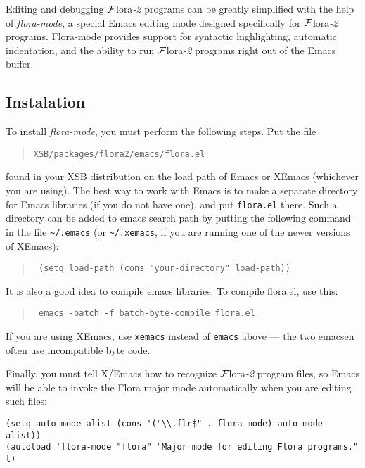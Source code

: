 \documentclass[11pt]{article}
\newcommand{\FLORA}{{\mbox{${\cal F}${\sc lora}\rm\emph{-2}}}\xspace}
\begin{document}
Editing and debugging \FLORA programs can be greatly simplified with the
help of \emph{flora-mode}, a special Emacs editing mode designed
specifically for \FLORA programs. Flora-mode provides support for syntactic
highlighting, automatic indentation, and the ability to run \FLORA programs
right out of the Emacs buffer.


\subsection{Instalation}


To install \emph{flora-mode}, you must perform the following steps. Put the
file
\begin{quote}
  {\tt XSB/packages/flora2/emacs/flora.el} 
\end{quote}
found in your XSB distribution on the load path of Emacs or XEmacs
(whichever you are using). The best way to work with Emacs is to make a
separate directory for Emacs libraries (if you do not have one), and put
{\tt flora.el} there. Such a directory can be added to emacs search path by
putting the following command in the file \verb|~/.emacs| (or
\verb|~/.xemacs|, if you are running one of the newer versions of XEmacs):
\begin{quote}
  \tt
   (setq load-path (cons "your-directory" load-path)) 
\end{quote}
It is also a good idea to compile emacs libraries. To compile flora.el,
use this:
\begin{quote}
  \tt
   emacs -batch -f batch-byte-compile flora.el 
\end{quote}
If you are using XEmacs, use {\tt xemacs} instead of {\tt emacs} above ---
the two emacsen often use incompatible byte code.

Finally, you must tell X/Emacs how to recognize \FLORA program files, so
Emacs will be able to invoke the Flora major mode automatically when you
are editing such files:
\begin{verbatim}
(setq auto-mode-alist (cons '("\\.flr$" . flora-mode) auto-mode-alist))
(autoload 'flora-mode "flora" "Major mode for editing Flora programs." t)
\end{verbatim}
\end{document}
